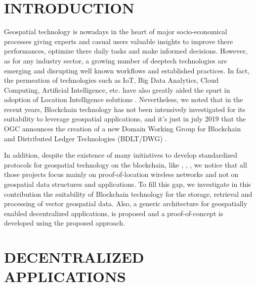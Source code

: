 \documentclass{isprs} %
\begin{document}

\maketitle


\section{INTRODUCTION}\label{INTRODUCTION}
 
\sloppy

Geospatial technology is nowadays in the heart of major socio-economical processes giving experts and casual users valuable insights to improve there performances, optimize there daily tasks and make informed decisions. However, as for any industry sector, a growing number of deeptech technologies are emerging and disrupting well known workflows and established practices. In fact, the permeation of technologies such as IoT, Big Data Analytics, Cloud Computing, Artificial Intelligence, etc. have also greatly aided the spurt in adoption of Location Intelligence solutions \cite{geobuiz2019}. Nevertheless, we noted that in the recent years, Blockchain technology has not been intensively investigated for its suitability to leverage geospatial applications, and it's just in july 2019 that the OGC announces the creation of a new Domain Working Group for Blockchain and Distributed Ledger Technologies (BDLT/DWG) \cite{ogcbdltdwg}.

In addition, despite the existence of many initiatives to develop standardized protocols for geospatial technology on the blockchain, like \cite{foam}, \cite{xyo}, \cite{helium}, we notice that all those projects focus mainly on proof-of-location wireless networks and not on geospatial data structures and applications. To fill this gap, we investigate in this contribution the suitability of Blockchain technology for the storage, retrieval and processing of vector geospatial data. Also, a generic architecture for geospatially enabled decentralized applications, is proposed and a proof-of-concept is developed using the proposed approach.

\newpage

\section{DECENTRALIZED APPLICATIONS}\label{sec:DECENTRALIZED APPLICATIONS}
 
\end{document}
